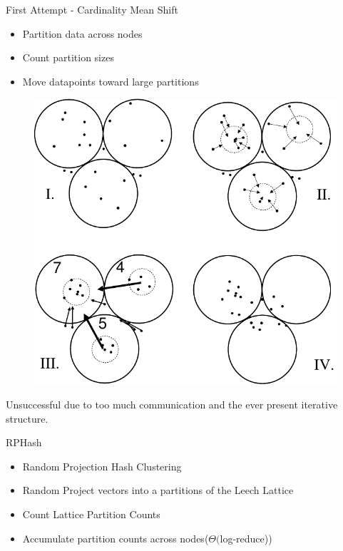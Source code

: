 \documentclass{beamer}
\begin{document}
\begin{frame}{First Attempt - Cardinality Mean Shift}
\begin{itemize}
 \item Partition data across nodes
 \item Count partition sizes
 \item Move datapoints toward large partitions
\end{itemize}
 \begin{figure}
  \centering \includegraphics[scale=.30]{doc/cardshift}
\end{figure}
Unsuccessful due to too much communication and the ever present iterative structure.
\end{frame}
\begin{frame}{RPHash}
 \begin{itemize}
  \item Random Projection Hash Clustering
  \item Random Project vectors into a partitions of the Leech Lattice
  \item Count Lattice Partition Counts
  \item Accumulate partition counts across nodes($\Theta($log-reduce))
 \end{itemize}
\end{frame}
\end{document}

